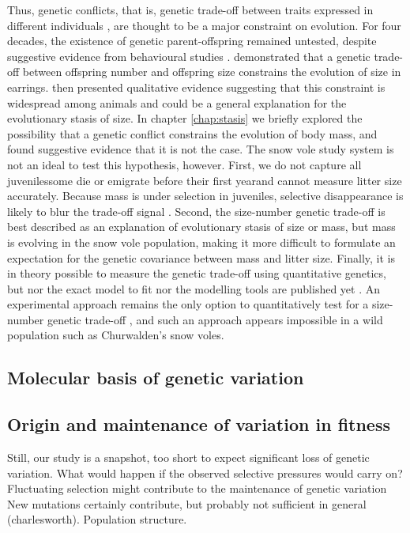 Thus, genetic conflicts, that is, genetic trade-off between traits expressed in different individuals \parencite{Trivers1974}, are thought to be a major constraint on evolution. For four decades, the existence of genetic parent-offspring remained untested, despite suggestive evidence from behavioural studies \parencite{Kolliker2015}. \cite{Kolliker2015} demonstrated that a genetic trade-off between offspring number and offspring size constrains the evolution of size in earrings. \cite{Rollinson2015b} then presented qualitative evidence suggesting that this constraint is widespread among animals and could be a general explanation for the evolutionary stasis of size. 
In chapter \ref{chap:stasis} we briefly explored the possibility that a genetic conflict constrains the evolution of body mass, and found suggestive evidence that it is not the case. The snow vole study system is not an ideal to test this hypothesis, however. First, we do not capture all juveniles\textemdash some die or emigrate before their first year\textemdash and cannot measure litter size accurately. Because mass is under selection in juveniles,  selective disappearance is likely to blur the trade-off signal \parencite{Hadfield2011}. Second, the size-number genetic trade-off is best described as an explanation of evolutionary stasis of size or mass, but mass is evolving in the snow vole population, making it more difficult to formulate an expectation for the genetic covariance between mass and litter size. 
Finally, it is in theory possible to measure the genetic trade-off using quantitative genetics, but nor the exact model to fit nor the modelling tools are published yet \parencite{Hadfield2012, Rollinson2015b}. An experimental approach remains the only option to quantitatively test for a size-number genetic trade-off \parencite{Kolliker2015}, and such an approach appears impossible in a wild population such as Churwalden's snow voles. 

\subsection{Molecular basis of genetic variation}

\subsection{Origin and maintenance of variation in fitness}
Still, our study is a snapshot, too short to expect significant loss of genetic variation. What would happen if the observed selective pressures would carry on? 
Fluctuating selection might contribute to the maintenance of genetic variation
New mutations certainly contribute, but probably not sufficient in general (charlesworth).
Population structure. 

